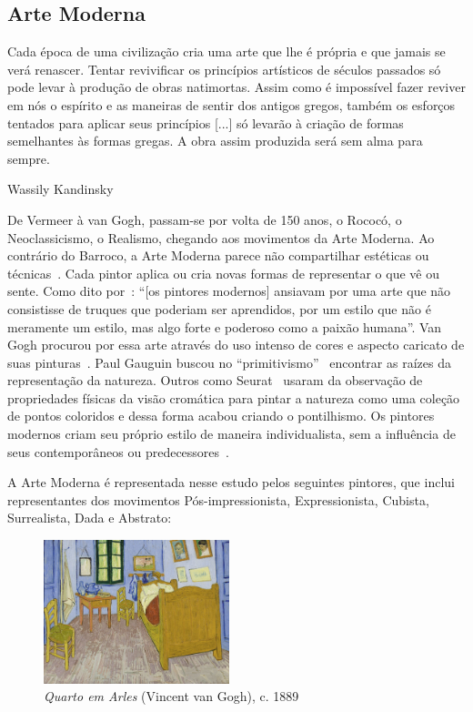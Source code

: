 \subsection{Arte Moderna}

\setlength{\epigraphwidth}{0.8\textwidth}
\epigraph{Cada época de uma civilização cria uma arte que lhe é própria e que
  jamais se verá renascer. Tentar revivificar os princípios artísticos de
  séculos passados só pode levar à produção de obras natimortas. Assim como é
  impossível fazer reviver em nós o espírito e as maneiras de sentir dos antigos
  gregos, também os esforços tentados para aplicar seus princípios [...] só
  levarão à criação de formas semelhantes às formas gregas. A obra assim
  produzida será sem alma para sempre.}{Wassily Kandinsky~\cite{kandinsky}}

De Vermeer à van Gogh, passam-se por volta de 150 anos, o Rococó, o
Neoclassicismo, o Realismo, chegando aos movimentos da Arte
Moderna. Ao contrário do Barroco, a Arte Moderna parece não
compartilhar estéticas ou técnicas~\cite{dempsey}. Cada pintor aplica
ou cria novas formas de representar o que vê ou sente. Como dito
por~\citeauthor{gombrich}: ``[os pintores modernos] ansiavam por uma
arte que não consistisse de truques que poderiam ser aprendidos, por
um estilo que não é meramente um estilo, mas algo forte e poderoso
como a paixão humana''. Van Gogh procurou por essa arte através do uso
intenso de cores e aspecto caricato de suas pinturas~\cite{hulsker}.
Paul Gauguin buscou no ``primitivismo''~\cite{lovejoy} encontrar as
raízes da representação da natureza. Outros como Seurat~\cite{kemp}
usaram da observação de propriedades físicas da visão cromática para
pintar a natureza como uma coleção de pontos coloridos e dessa forma
acabou criando o pontilhismo. Os pintores modernos criam seu próprio
estilo de maneira individualista, sem a influência de seus
contemporâneos ou predecessores~\cite{gombrich}.

A Arte Moderna é representada nesse estudo pelos seguintes pintores, que inclui representantes dos movimentos Pós-impressionista, Expressionista, Cubista, Surrealista, Dada e Abstrato:

\begin{figure}
  \begin{center}
    \includegraphics[width=0.48\textwidth]{figs/vangogh_quarto.png}
  \end{center}
  \caption{\emph{Quarto em Arles} (Vincent van Gogh), c. 1889}
  \label{fig:vangogh:quarto}
\end{figure}

